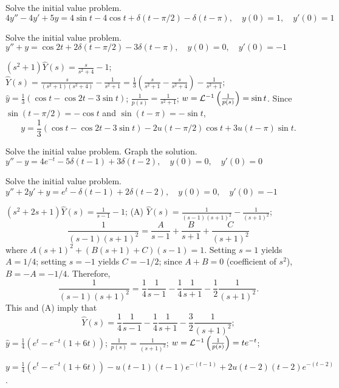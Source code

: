 \documentclass{ximera}
\begin{document}
\begin{problem}\label{exer:8.7.15}
Solve the initial value
problem.
$4y''-4y'+5y=4\sin t-4\cos
t+\delta(t-\pi/2)-\delta(t-\pi), \quad  y(0)=1,\quad y'(0)=1$
\end{problem}

\begin{problem}\label{exer:8.7.16}
Solve the initial value
problem.
$y''+y=\cos2t+2\delta(t-\pi/2)-3\delta(t-\pi), \quad  y(0)=0,\quad y'(0)=-1$

\begin{solution}
$(s^2+1)\hat Y(s)=\frac{s}{s^2+4}-1$;
$\hat Y(s)=\frac{s}{(s^2+1)(s^2+4)}-\frac{1}{s^2+1}
=\frac{1}{3}\left(\frac{s}{s^2+1}-\frac{s}{s^2+4}\right)-\frac{1}{s^2+1}$;
$\hat y=\frac{1}{3}(\cos t-\cos2t-3\sin t)$;
$\frac{1}{p(s)}=\frac{1}{s^2+1}$;
$w={\cal L}^{-1}\left(\frac{1}{p(s)}\right)=\sin t$.
Since $\sin(t-\pi/2)=-\cos t$ and $\sin(t-\pi)=-\sin t$,
$$
y=\frac{1}{3}(\cos t-\cos2t-3\sin t)-2u(t-\pi/2)\cos t+3u(t-\pi)\sin t.
$$
\end{solution}
\end{problem}

\begin{problem}\label{exer:8.7.17} Solve the initial value problem.  Graph the solution.
$y''-y=4e^{-t}-5\delta(t-1)+3\delta(t-2), \quad  y(0)=0,\quad y'(0)=0$
\end{problem}

\begin{problem}\label{exer:8.7.18}
Solve the initial value
problem.
$y''+2y'+y=e^t-\delta(t-1)+2\delta(t-2), \quad  y(0)=0,\quad y'(0)=-1$

\begin{solution}
$(s^2+2s+1)\hat Y(s)=\frac{1}{s-1}-1$;
(A) $\hat Y(s)=\frac{1}{(s-1)(s+1)^2}-\frac{1}{(s+1)^2}$;
$$
\frac{1}{(s-1)(s+1)^2}=\frac{A}{s-1}+\frac{B}{s+1}+\frac{C}{(s+1)^2}
$$
where
$A(s+1)^2+(B(s+1)+C)(s-1)=1$. Setting $s=1$ yields $A=1/4$;
setting $s=-1$ yields $C=-1/2$; since $A+B=0$ (coefficient of $s^2$),
$B=-A=-1/4$. Therefore,
$$
\frac{1}{(s-1)(s+1)^2}=\frac{1}{4}\frac{1}{s-1}-\frac{1}{4}\frac{1}{s+1}-\frac{1}{2}\frac{1}{(s+1)^2}.
$$
This and (A) imply that
$$
\hat Y(s)=\frac{1}{4}\frac{1}{s-1}-\frac{1}{4}\frac{1}{s+1}-\frac{3}{2}\frac{1}{(s+1)^2};
$$
$\hat y=\frac{1}{4}\left(e^t-e^{-t}(1+6t)\right)$;
$\frac{1}{p(s)}=\frac{1}{(s+1)^2}$;
$w={\cal L}^{-1}\left(\frac{1}{p(s)}\right)=te^{-t}$;

$y=\frac{1}{4}\left(e^t-e^{-t}(1+6t)\right)-
u(t-1)(t-1)e^{-(t-1)}+2u(t-2)(t-2)e^{-(t-2)}$.
\end{solution}
\end{problem}
\end{document}
